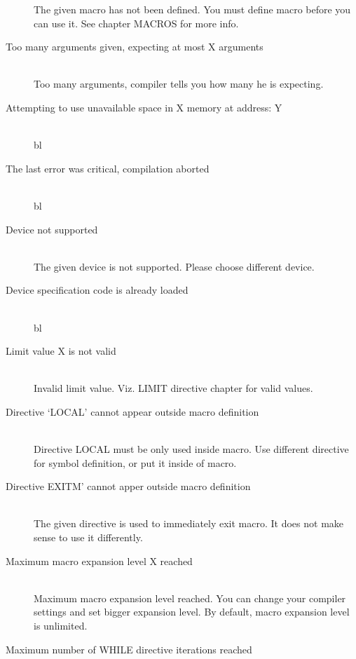 \begin{description}
                    The given macro has not been defined. You must define macro before you can use it. See chapter MACROS for more info.
                    \item[Too many arguments given, expecting at most X arguments] \hfill \\             %
                    Too many arguments, compiler tells you how many he is expecting.
                    \item[Attempting to use unavailable space in X memory at address: Y ] \hfill \\  %
                    bl
                    \item[The last error was critical, compilation aborted] \hfill \\                   %
                    bl
                    \item[Device not supported] \hfill \\
                    The given device is not supported. Please choose different device.
                    \item[Device specification code is already loaded ] \hfill \\                       %
                    bl
                    \item[Limit value X is not valid] \hfill \\
                    Invalid limit value. Viz. LIMIT directive chapter for valid values.
                    \item[Directive `LOCAL' cannot appear outside macro definition ] \hfill \\   %
                    Directive LOCAL must be only used inside macro. Use different directive for symbol definition, or put it inside of macro.
                    \item[Directive EXITM' cannot apper outside macro definition] \hfill \\
                    The given directive is used to immediately exit macro. It does not make sense to use it differently.
                    \item[Maximum macro expansion level X reached  ] \hfill \\
                    Maximum macro expansion level reached. You can change your compiler settings and set bigger expansion level.
                    By default, macro expansion level is unlimited.
                    \item[Maximum number of WHILE directive iterations reached ] \hfill \\    %

\end{description}
